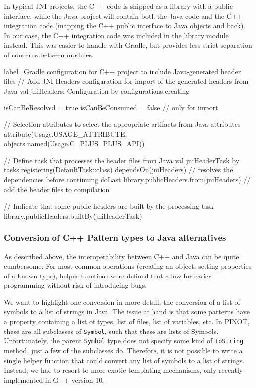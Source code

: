 In typical JNI projects, the C++ code is shipped as a library with a public interface, while the Java project will contain both the Java code and the C++ integration code (mapping the C++ public interface to Java objects and back). In our case, the C++ integration code was included in the library module instead. This was easier to handle with Gradle, but provides less strict separation of concerns between modules.

\begin{kotlinlong*}{label=\rm Gradle configuration for C++ project to include Java-generated header files}
// Add JNI Headers configuration for import of the generated headers from Java
val jniHeaders: Configuration by configurations.creating {
    isCanBeResolved = true
    isCanBeConsumed = false // only for import
    
    // Selection attributes to select the appropriate artifacts from Java
    attributes {
        attribute(Usage.USAGE_ATTRIBUTE, objects.named(Usage.C_PLUS_PLUS_API))
    }
    
    // Define task that processes the header files from Java
    val jniHeaderTask by tasks.registering(DefaultTask::class) {
        dependsOn(jniHeaders) // resolves the dependencies before continuing
        doLast {
            library.publicHeaders.from(jniHeaders) // add the header files to compilation
        }
    }
    
    // Indicate that some public headers are built by the processing task
    library.publicHeaders.builtBy(jniHeaderTask)
}
\end{kotlinlong*}

\subsubsection{Conversion of C++ Pattern types to Java alternatives}
As described above, the interoperability between C++ and Java can be quite cumbersome. For most common operations (creating an object, setting properties of a known type), helper functions were defined that allow for easier programming without risk of introducing bugs.

We want to highlight one conversion in more detail, the conversion of a list of symbols to a list of strings in Java. The issue at hand is that some patterns have a property containing a list of types, list of files, list of variables, etc. In PINOT, these are all subclasses of {\tt Symbol}, such that these are lists of Symbols. Unfortunately, the parent {\tt Symbol} type does not specify some kind of {\tt toString} method, just a few of the subclasses do. Therefore, it is not possible to write a single helper function that could convert any list of symbols to a list of strings. Instead, we had to resort to more exotic templating mechanisms, only recently implemented in G++ version 10.


